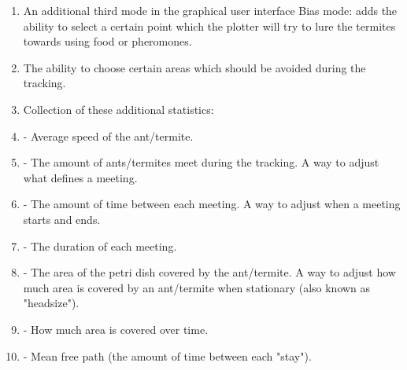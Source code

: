 \begin{enumerate}
	\item An additional third mode in the graphical user interface Bias mode: adds the ability to select a certain point which the plotter will try to lure the termites towards using food or pheromones.
    \item The ability to choose certain areas which should be avoided during the tracking.
    \item Collection of these additional statistics:
    \item - Average speed of the ant/termite.
    \item - The amount of ants/termites meet during the tracking. A way to adjust what defines a meeting.
    \item - The amount of time between each meeting. A way to adjust when a meeting starts and ends.
    \item - The duration of each meeting.
    \item - The area of the petri dish covered by the ant/termite. A way to adjust how much area is covered by an ant/termite when stationary (also known as "headsize").
    \item - How much area is covered over time.
    \item - Mean free path (the amount of time between each "stay").
\end{enumerate}



